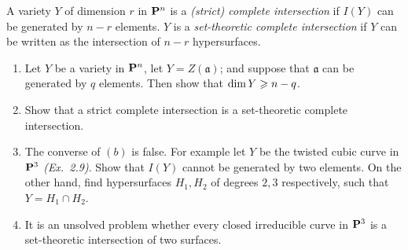 \documentclass[10pt]{amsart}
\begin{document}
\begin{exercise}[2.17]
    A variety $Y$ of dimension $r$ in ${\bf P}^n$ is a \emph{(strict) complete
    intersection} if $I(Y)$ can be generated by $n-r$ elements. $Y$ is a
    \emph{set-theoretic complete intersection} if $Y$ can be written as the
    intersection of $n-r$ hypersurfaces.
    \begin{enumerate}
    \item Let $Y$ be a variety in ${\bf P}^n$, let $Y = Z(\mathfrak{a})$; and
    suppose that $\mathfrak{a}$ can be generated by $q$ elements. Then show
    that $\operatorname{\rm{dim}} Y \geqslant n-q$. 
    \item Show that a strict complete intersection is a set-theoretic complete
    intersection.
    \item The converse of $(b)$ is false. For example let $Y$ be the twisted
    cubic curve in ${\bf P}^3$ {\emph{(Ex.\ 2.9)}}. Show that
    $I(Y)$ cannot be generated by two elements. On the other hand, find
    hypersurfaces $H_1,H_2$ of degrees $2,3$ respectively, such that
    $Y = H_1 \cap H_2$. 
    \item It is an unsolved problem whether every closed irreducible curve in
    ${\bf P}^3$ is a set-theoretic intersection of two surfaces.
    \end{enumerate}
\end{exercise}

\begin{solution}
    
\end{solution}
\end{document}
